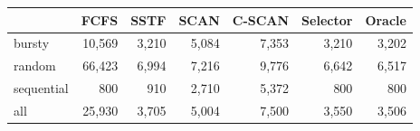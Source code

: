 \begin{tabular}{lrrrrrr}\toprule
 & FCFS & SSTF & SCAN & C-SCAN & Selector & Oracle\\\midrule
bursty & 10,569 & 3,210 & 5,084 & 7,353 & 3,210 & 3,202\\
random & 66,423 & 6,994 & 7,216 & 9,776 & 6,642 & 6,517\\
sequential & 800 & 910 & 2,710 & 5,372 & 800 & 800\\
all & 25,930 & 3,705 & 5,004 & 7,500 & 3,550 & 3,506\\
\bottomrule\end{tabular}
